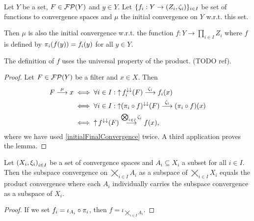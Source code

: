 \begin{lemma} \label{initialConvergenceWrtOneFunction}
Let $Y$ be a set, $F\in \operatorname{\mathcal{FP}}(Y)$ and $y\in Y$. Let $\{f_i: Y\to \sSet{Z_i, \zeta_i}\}_{i\in I}$ be set of functions to convergence spaces and $\mu$ the initial convergence on $Y$ w.r.t. this set.

Then $\mu$ is also the initial convergence w.r.t. the function $f: Y\to \prod_{i\in I}Z_i$ where $f$ is defined by $\pi_i(f(y)) = f_i(y)$ for all $y\in Y$.
\end{lemma}
The definition of $f$ uses the universal property of the product. (TODO ref).
\begin{proof}
Let $F\in \operatorname{\mathcal{FP}}(Y)$ be a filter and $x\in X$. Then
\begin{align*}
F \overset{\mu}{\longrightarrow} x &\iff \forall i\in I:  \operatorname{\uparrow} f_i^{\downarrow\downarrow}(F) \overset{\zeta_i}{\longrightarrow} f_i(x) \\
&\iff \forall i\in I: \operatorname{\uparrow} (\pi_i\circ f)^{\downarrow\downarrow}(F) \overset{\zeta_i}{\longrightarrow} (\pi_i\circ f)(x) \\
&\iff  \operatorname{\uparrow} f^{\downarrow\downarrow}(F) \overset{\bigotimes_{i\in I}\zeta_i}{\longrightarrow} f(x),
\end{align*}
where we have used \ref{initialFinalConvergence} twice. A third application proves the lemma.
\end{proof}
\begin{corollary} \label{productAndSubspaceConvergencesCommute}
Let $\sSet{X_i,\xi_i}_{i\in I}$ be a set of convergence spaces and $A_i \subseteq X_i$ a subset for all $i\in I$. Then the subspace convergence on $\bigtimes_{i\in I}A_i$ as a subspace of $\bigtimes_{i\in I}X_i$ equals the product convergence where each $A_i$ individually carries the subspace convergence as a subspace of $X_i$.
\end{corollary}
\begin{proof}
If we set $f_i = \iota_{A_i}\circ \pi_{i}$, then $f = \iota_{\bigtimes_{i\in I}A_i}$.
\end{proof}

